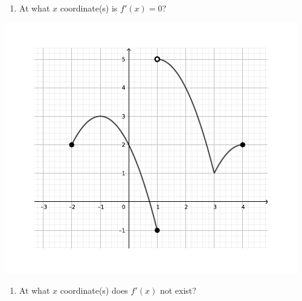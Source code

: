 \documentclass[12pt]{article}
\begin{document}
\begin{enumerate}
\begin{multicols}{2}
\begin{enumerate}
\item At what $x$ coordinate(s) is $f'(x)=0$?
 \end{enumerate}
 \begin{center}
 \includegraphics[width=0.9\columnwidth]{TT3_fig1}
 \end{center}
 \end{multicols}
 
 
 
\begin{enumerate}
\addtocounter{enumii}{3}

\vspace{1cm}

\item At what $x$ coordinate(s) does $f'(x)$ not exist?
\end{enumerate}
\end{enumerate}
\end{document}
